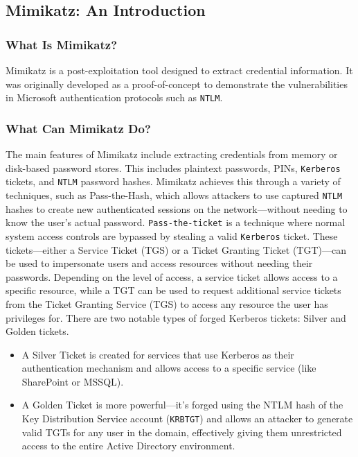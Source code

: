 \documentclass[a4paper]{article}
\newcommand{\abc}{\hfill \break}
\begin{document}
\subsection{Mimikatz: An Introduction}
\subsubsection{What Is Mimikatz?}
Mimikatz is a post-exploitation tool designed to extract credential information. It was originally developed as a proof-of-concept to demonstrate the vulnerabilities in Microsoft authentication protocols such as \texttt{NTLM}. \cite{a_cyberkid_detailed_2024}
\subsubsection{What Can Mimikatz Do?}
The main features of Mimikatz include extracting credentials from memory or disk-based password stores. This includes plaintext passwords, PINs, \texttt{Kerberos} tickets, and \texttt{NTLM} password hashes.\abc
Mimikatz achieves this through a variety of techniques, such as Pass-the-Hash, which allows attackers to use captured \texttt{NTLM} hashes to create new authenticated sessions on the network—without needing to know the user’s actual password. \cite{pass-the-hash, a_cyberkid_detailed_2024}
\texttt{Pass-the-ticket} is a technique where normal system access controls are bypassed by stealing a valid \texttt{Kerberos} ticket. These tickets—either a Service Ticket (TGS) or a Ticket Granting Ticket (TGT)—can be used to impersonate users and access resources without needing their passwords.\abc
Depending on the level of access, a service ticket allows access to a specific resource, while a TGT can be used to request additional service tickets from the Ticket Granting Service (TGS) to access any resource the user has privileges for.\abc
There are two notable types of forged Kerberos tickets: Silver and Golden tickets. \cite{a_cyberkid_detailed_2024, pass-the-ticket}
\begin{itemize}
    \item A Silver Ticket is created for services that use Kerberos as their authentication mechanism and allows access to a specific service (like SharePoint or MSSQL).
    \item A Golden Ticket is more powerful—it’s forged using the NTLM hash of the Key Distribution Service account (\texttt{KRBTGT}) and allows an attacker to generate valid TGTs for any user in the domain, effectively giving them unrestricted access to the entire Active Directory environment.
\end{itemize}
\end{document}
